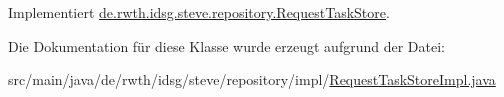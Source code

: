 Implementiert \hyperlink{interfacede_1_1rwth_1_1idsg_1_1steve_1_1repository_1_1_request_task_store_af22a1410a8649879431472bec063b856}{de.\+rwth.\+idsg.\+steve.\+repository.\+Request\+Task\+Store}.



Die Dokumentation für diese Klasse wurde erzeugt aufgrund der Datei\+:\begin{DoxyCompactItemize}
\item 
src/main/java/de/rwth/idsg/steve/repository/impl/\hyperlink{_request_task_store_impl_8java}{Request\+Task\+Store\+Impl.\+java}\end{DoxyCompactItemize}
